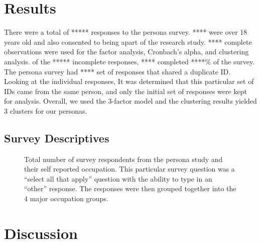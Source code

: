 \documentclass[../main.tex]{subfiles}
\begin{document}
\section{Results}

    There were a total of ***** responses to the persona survey.
    **** were over 18 years old and also consented to being apart of the research study.
    **** complete observations were used for the factor analysis, Cronbach's alpha, and clustering analysis.
    of the ***** incomplete responses,
    **** completed ****\% of the survey.
    The persona survey had **** set of responses that shared a duplicate ID.
    Looking at the individual responses,
    It was determined that this particular set of IDs came from the same person,
    and only the initial set of responses were kept for analysis.
    Overall, we used the 3-factor model and the clustering results yielded 3 clusters for our personas.

    \subsection{Survey Descriptives}

    \begin{figure}
        \centering
        \caption[Grouped demographics for persona survey respondents]
            {Total number of survey respondents from the persona study and their self reported occupation.
                This particular survey question was a ``select all that apply''
                question with the ability to type in an ``other'' response.
                The responses were then grouped together into the 4 major occupation groups.
            }
        \label{fig:groupeddemographics}
    \end{figure}


\section{Discussion}
\end{document}
